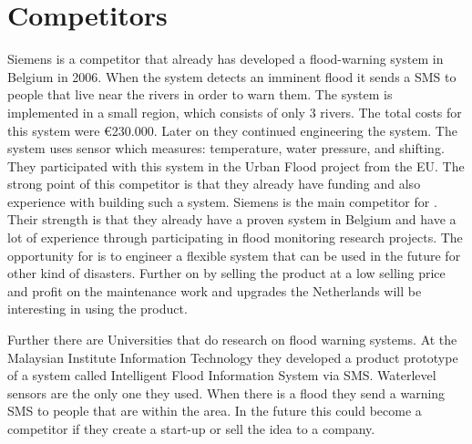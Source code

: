 \section{Competitors}
Siemens is a competitor that already has developed a flood-warning system in Belgium in 2006. When the system detects an imminent flood it sends a SMS to people that live near the rivers in order to warn them. The system is implemented in a small region, which consists of only 3 rivers. The total costs for this system were \euro{}230.000. Later on they continued engineering the system. The system uses sensor which measures: temperature, water pressure, and shifting. They participated with this system in the Urban Flood project from the EU. The strong point of this competitor is that they already have funding and also experience with building such a system. Siemens is the main competitor for \CompanyName{}. Their strength is that they already have a proven system in Belgium and have a lot of experience through participating in flood monitoring research projects. The opportunity for \CompanyName{} is to engineer a flexible system that can be used in the future for other kind of disasters. Further on by selling the product at a low selling price and profit on the maintenance work and upgrades the Netherlands will be interesting in using the product.

Further there are Universities that do research on flood warning systems. At the Malaysian Institute Information Technology they developed a product prototype of a system called Intelligent Flood Information System via SMS. Waterlevel sensors are the only one they used. When there is a flood they send a warning SMS to people that are within the area. In the future this could become a competitor if they create a start-up or sell the idea to a company.  




